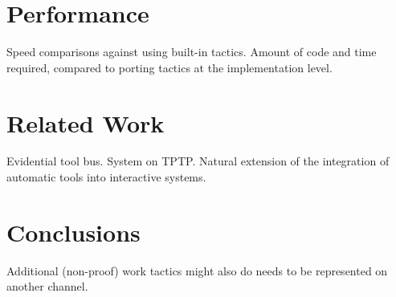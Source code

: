 \documentclass{llncs}
\begin{document}
\section{Performance}
\label{sec:performance}

Speed comparisons against using built-in tactics.
Amount of code and time required, compared to porting tactics at the implementation level.

\section{Related Work}

Evidential tool bus.
System on TPTP.
Natural extension of the integration of automatic tools into interactive systems.

\section{Conclusions}

Additional (non-proof) work tactics might also do needs to be represented on another channel.



\end{document}
